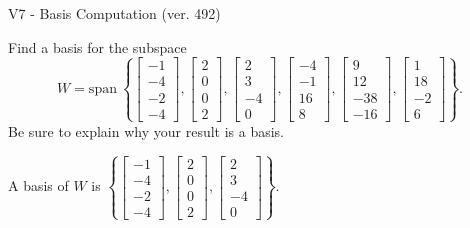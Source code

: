 \begin{exercise}
  \begin{exerciseTitle}V7 - Basis Computation (ver. 492)\end{exerciseTitle}
  \begin{exerciseStatement}
    Find a basis for the subspace 
\[W=\mathrm{span}\ \left\{\left[\begin{array}{r}
-1 \\
-4 \\
-2 \\
-4
\end{array}\right] , \left[\begin{array}{r}
2 \\
0 \\
0 \\
2
\end{array}\right] , \left[\begin{array}{r}
2 \\
3 \\
-4 \\
0
\end{array}\right] , \left[\begin{array}{r}
-4 \\
-1 \\
16 \\
8
\end{array}\right] , \left[\begin{array}{r}
9 \\
12 \\
-38 \\
-16
\end{array}\right] , \left[\begin{array}{r}
1 \\
18 \\
-2 \\
6
\end{array}\right]\right\}.\]
 Be sure to explain why your result is a basis.


  \end{exerciseStatement}
  \begin{exerciseAnswer}
   A basis of \(W\) is  \(\left\{\left[\begin{array}{r}
-1 \\
-4 \\
-2 \\
-4
\end{array}\right] , \left[\begin{array}{r}
2 \\
0 \\
0 \\
2
\end{array}\right] , \left[\begin{array}{r}
2 \\
3 \\
-4 \\
0
\end{array}\right]\right\}\).
  


  \end{exerciseAnswer}
\end{exercise}